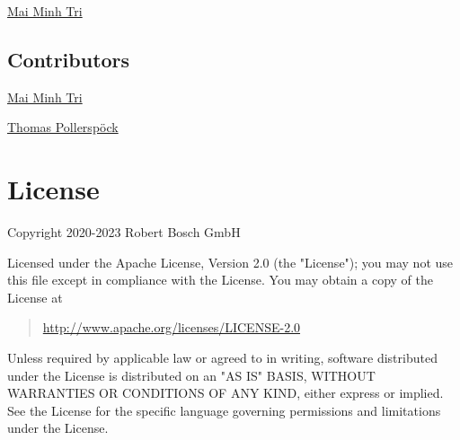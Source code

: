 \href{mailto:Tri.MaiMinh@vn.bosch.com}{Mai Minh Tri}

\hypertarget{description-contributors}{%
\subsection{Contributors}\label{description-contributors}}

\href{mailto:Tri.MaiMinh@vn.bosch.com}{Mai Minh Tri}

\href{mailto:Thomas.Pollerspoeck@de.bosch.com}{Thomas Pollerspöck}

\hypertarget{description-license}{%
\section{License}\label{description-license}}

Copyright 2020-2023 Robert Bosch GmbH

Licensed under the Apache License, Version 2.0 (the "License"); you may
not use this file except in compliance with the License. You may obtain
a copy of the License at

\begin{quote}
\url{http://www.apache.org/licenses/LICENSE-2.0}
\end{quote}

Unless required by applicable law or agreed to in writing, software
distributed under the License is distributed on an "AS IS" BASIS,
WITHOUT WARRANTIES OR CONDITIONS OF ANY KIND, either express or implied.
See the License for the specific language governing permissions and
limitations under the License.

